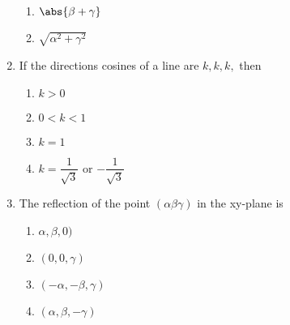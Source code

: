 \begin{enumerate}[label=\thesection.\arabic*,ref=\thesection.\theenumi]
\begin{enumerate}
	\item $\abs{\beta+\gamma}$
	\item $\sqrt{\alpha^2+\gamma^2}$
\end{enumerate}
\item If the directions cosines of a line are $k,k,k,$ then
\begin{enumerate}
	\item $k>0$
	\item $0<k<1$
	\item $k=1$ 
	\item $k=\dfrac{1}{\sqrt{3}}$ or $-\dfrac{1}{\sqrt{3}}$
\end{enumerate}
\item The reflection of the point $(\alpha \beta \gamma )$ in the xy-plane is 
\begin{enumerate}
	\item $\alpha,\beta,0)$
	\item $(0,0,\gamma)$
	\item $(-\alpha,-\beta,\gamma)$
	\item $(\alpha,\beta,-\gamma)$
\end{enumerate}

\end{enumerate}
